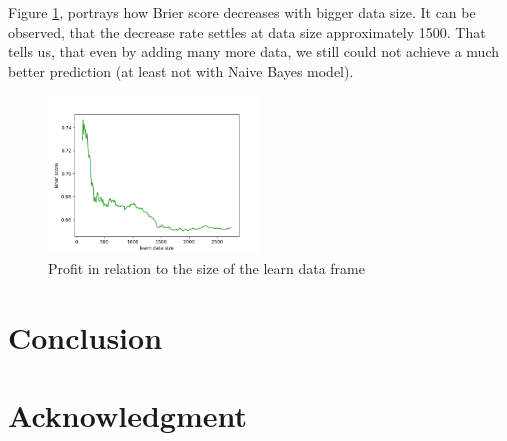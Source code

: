 \documentclass[conference]{IEEEtran}
\begin{document}
Figure \ref{data_size_brier}, portrays how Brier score decreases with bigger data size. It
can be observed, that the decrease rate settles at data size approximately 1500. That tells us,
that even by adding many more data, we still could not achieve a much better prediction (at
least not with Naive Bayes model).

\begin{figure}[!ht]
\includegraphics[width=0.5\textwidth]{brier-data_size.png}
\caption{Profit in relation to the size of the learn data frame}
\label{data_size_brier}
\end{figure}

\section{Conclusion}

\section*{Acknowledgment}


 
\end{document}
